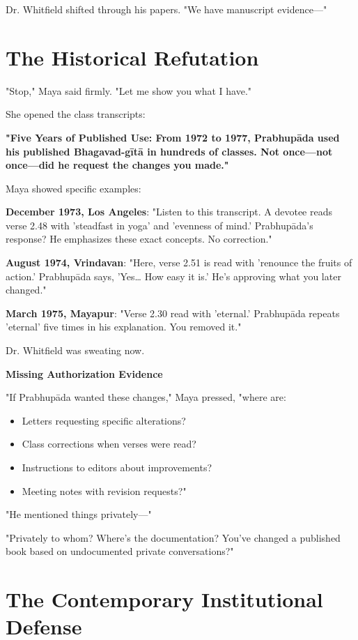\documentclass[11pt,twoside]{book}
\begin{document}
Dr. Whitfield shifted through his papers. "We have manuscript evidence—"
\section*{The Historical Refutation}
\label{sec:org9b8a380}

"Stop," Maya said firmly. "Let me show you what I have."

She opened the class transcripts:

\textbf{\textbf{"Five Years of Published Use: From 1972 to 1977, Prabhupāda used his published Bhagavad-gītā in hundreds of classes. Not once—not once—did he request the changes you made."}}

Maya showed specific examples:

\textbf{\textbf{December 1973, Los Angeles}}: "Listen to this transcript. A devotee reads verse 2.48 with 'steadfast in yoga' and 'evenness of mind.' Prabhupāda's response? He emphasizes these exact concepts. No correction."

\textbf{\textbf{August 1974, Vrindavan}}: "Here, verse 2.51 is read with 'renounce the fruits of action.' Prabhupāda says, 'Yes\ldots{} How easy it is.' He's approving what you later changed."

\textbf{\textbf{March 1975, Mayapur}}: "Verse 2.30 read with 'eternal.' Prabhupāda repeats 'eternal' five times in his explanation. You removed it."

Dr. Whitfield was sweating now.

\textbf{\textbf{Missing Authorization Evidence}}

"If Prabhupāda wanted these changes," Maya pressed, "where are:
\begin{itemize}
\item Letters requesting specific alterations?
\item Class corrections when verses were read?
\item Instructions to editors about improvements?
\item Meeting notes with revision requests?"
\end{itemize}

"He mentioned things privately—"

"Privately to whom? Where's the documentation? You've changed a published book based on undocumented private conversations?"
\section*{The Contemporary Institutional Defense}
\label{sec:org027190c}
\end{document}
